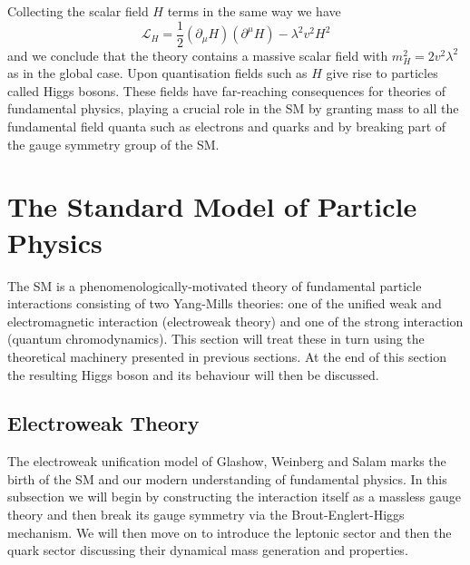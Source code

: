 Collecting the scalar field $H$ terms in the same way we have 
\begin{equation}
    \label{eq:theory:abelian_scalar_SSB_L}
    \mathcal{L}_{H} = \frac{1}{2}(\partial_{\mu}H)(\partial^{\mu}H) - \lambda^{2}v^{2}H^{2}%
\end{equation}
and we conclude that the theory contains a massive scalar field with $m_{H}^{2} = 2v^{2}\lambda^{2}$ as in the global case. Upon quantisation fields such as $H$ give rise to particles \cite{HiggsPaper} called Higgs bosons. These fields have far-reaching consequences for theories of fundamental physics, playing a crucial role in the SM by granting mass to all the fundamental field quanta such as electrons and quarks and by breaking part of the gauge symmetry group of the SM. 


\section{The Standard Model of Particle Physics}
The SM is a phenomenologically-motivated theory of fundamental particle interactions consisting of two Yang-Mills theories: one of the unified weak and electromagnetic interaction (electroweak theory) and one of the strong interaction (quantum chromodynamics). This section will treat these in turn using the theoretical machinery presented in previous sections. At the end of this section the resulting Higgs boson and its behaviour will then be discussed. 
\subsection{Electroweak Theory}
The electroweak unification model of Glashow, Weinberg and Salam \cite{Glashow,Weinberg,Salam} marks the birth of the SM and our modern understanding of fundamental physics. In this subsection we will begin by constructing the interaction itself as a massless gauge theory and then break its gauge symmetry via the Brout-Englert-Higgs mechanism. We will then move on to introduce the leptonic sector and then the quark sector discussing their dynamical mass generation and properties. 

